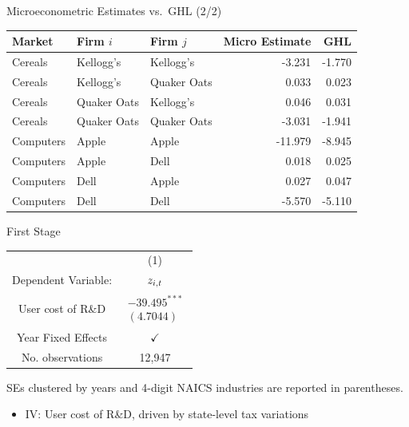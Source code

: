 \documentclass[
  10pt,
  aspectratio=169,   %
  handout           %
]{beamer}
\theoremstyle{plain}
\begin{document}
\begin{frame}[t]{Microeconometric Estimates vs.\ GHL \citep{Pellegrino2024-dn}  (2/2)}
  \begin{center}
    \begin{tabular}{lllrr}
      \toprule
      Market      & Firm $i$           & Firm $j$           & Micro Estimate & GHL    \\
      \midrule
      Cereals     & Kellogg's          & Kellogg's          & -3.231         & -1.770 \\
      Cereals     & Kellogg's          & Quaker Oats        &  0.033         &  0.023 \\
      Cereals     & Quaker Oats        & Kellogg's          &  0.046         &  0.031 \\
      Cereals     & Quaker Oats        & Quaker Oats        & -3.031         & -1.941 \\
      \addlinespace
      Computers   & Apple              & Apple              & -11.979        & -8.945 \\
      Computers   & Apple              & Dell               &  0.018         &  0.025 \\
      Computers   & Dell               & Apple              &  0.027         &  0.047 \\
      Computers   & Dell               & Dell               & -5.570         & -5.110 \\
      \bottomrule
    \end{tabular}
  \end{center}
  \hyperlink{product_identification}{}
\end{frame}

\begin{frame}{First Stage \hyperlink{regression}{}}
  \label{first_stage}
  \begin{center}
    \begin{tabular}{cc}
      \hline
      \hline              & (1)\tabularnewline
      Dependent Variable: & $\text{\ensuremath{z_{i,t}}}$\tabularnewline
      \hline
      User cost of R\&D   & $\begin{array}{c}
      -39.495^{***} \\
      (4.7044)
      \end{array}$\tabularnewline
      \hline
      Year Fixed Effects  & $\checkmark$\tabularnewline
      No. observations    & 12,947\tabularnewline
      \hline
    \end{tabular}
    \medskip{}
  \end{center}
  {\footnotesize
  SEs clustered by years and 4-digit NAICS industries are reported in parentheses.
  }
  \medskip{}
  \begin{itemize}
    \item IV: User cost of R\&D, driven by state-level tax variations \citep{Wilson2009-ri,Bloom2013-pn}
  \end{itemize}
\end{frame}
\end{document}

